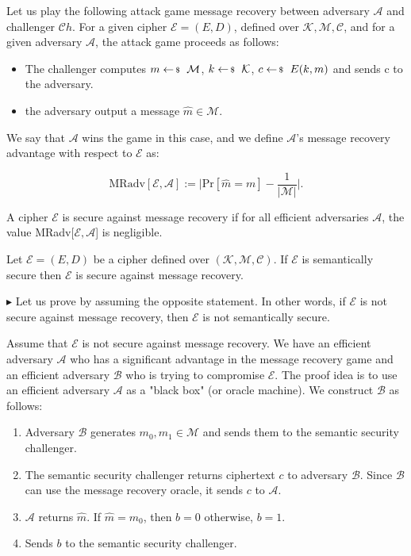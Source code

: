 \documentclass[../lecture-notes-148x210.tex]{subfiles}
\begin{document}
Let us play the following attack game message recovery between adversary $\mathcal{A}$ and challenger $\mathcal{C}h$.
For a given cipher $\mathcal{E} = (E, D)$, defined over $\mathcal{K}, \mathcal{M}, \mathcal{C}$, and for a given adversary $\mathcal{A}$, the attack game proceeds as follows: 

\begin{itemize}
    \item The challenger computes $m \leftarrowS \mathcal{M}$, $k \leftarrowS \mathcal{K}$, $c \leftarrowS E(k, m)$ and sends c to the adversary.
    \item the adversary output a message $\hat{m} \in \mathcal{M}$.
\end{itemize}

We say that $\mathcal{A}$ wins the game in this case, and we define $\mathcal{A}$'s message recovery advantage with respect to $\mathcal{E}$ as:

\begin{equation*}
    \text{MRadv}[\mathcal{E}, \mathcal{A}] := \Bigg|\text{Pr}[\hat{m} = m] - \frac{1}{|\mathcal{M}|}\Bigg|.
\end{equation*}

\begin{definition} 
    A cipher $\mathcal{E}$ is secure against message recovery if for all efficient adversaries $\mathcal{A}$, the value MRadv[$\mathcal{E}, \mathcal{A}$] is negligible.
\end{definition}

\begin{theorem}
    Let $\mathcal{E} = (E, D)$ be a cipher defined over $(\mathcal{K}, \mathcal{M}, \mathcal{C})$. If $\mathcal{E}$ is semantically secure then $\mathcal{E}$ is secure against message recovery.
\end{theorem}

$\blacktriangleright$ 
Let us prove by assuming the opposite statement. 
In other words, if $\mathcal{E}$ is not secure against message recovery, then $\mathcal{E}$ is not semantically secure.

Assume that $\mathcal{E}$ is not secure against message recovery. 
We have an efficient adversary $\mathcal{A}$ who has a significant advantage in the 
message recovery game and an efficient adversary $\mathcal{B}$ who is trying to 
compromise $\mathcal{E}$.
The proof idea is to use an efficient adversary $\mathcal{A}$ as a "black box" (or oracle machine). %
We construct $\mathcal{B}$ as follows:
\begin{enumerate}
    \item Adversary $\mathcal{B}$ generates $m_0, m_1 \in \mathcal{M}$ and sends them to the semantic security challenger.
    \item The semantic security challenger returns ciphertext $c$ to adversary $\mathcal{B}$. Since $\mathcal{B}$ can use 
    the message recovery oracle, it sends $c$ to $\mathcal{A}$. 
    \item $\mathcal{A}$ returns $\hat{m}$. If $\hat{m} = m_0$, then $b = 0$ otherwise, $b = 1$.
    \item Sends $b$ to the semantic security challenger. 
\end{enumerate}
\end{document}
